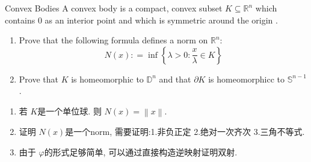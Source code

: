 \documentclass[../main.tex]{subfiles}
\begin{document}
\begin{problem}{Convex Bodies}{}
    A convex body is a compact, convex subset \(  K\subseteq \mathbb{R} ^{n}  \) which contains 0 as an interior point and which is symmetric around the origin .
    \begin{enumerate}
        \item Prove that the following formula defines a norm on  \(  \mathbb{R} ^{n}  \): \[
        N\left( x \right): =  \inf \left\{  \lambda > 0: \frac{x}{ \lambda }\in K \right\} 
        \] 
        \item Prove that \(  K  \) is homeomorphic to  \(  \mathbb{D}^{n}  \) and that \(   \partial K  \) is homeomorphicc to \(  \mathbb{S}^{n-1}  \)    . 
    \end{enumerate}
     
\end{problem}
\begin{note}
    \begin{enumerate}
        \item 若 \(  K  \)是一个单位球. 则 \(  N\left( x \right)= \left\| x \right\|   \).  
        \item 证明 \(  N\left( x \right)   \)是一个norm, 需要证明:1.非负正定 2.绝对一次齐次 3.三角不等式.    
        \item 由于 \(   \varphi   \)的形式足够简单, 可以通过直接构造逆映射证明双射.  
    \end{enumerate}
    
\end{note}
\end{document}
